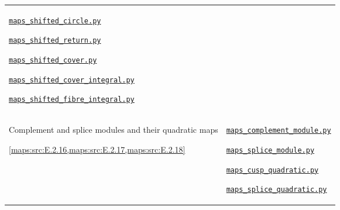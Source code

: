 \documentclass[11pt,a4paper]{article}
\numberwithin{equation}{section}
\theoremstyle{definition}
\newcommand{\SsixRepositoryCommit}{83d76022bcd442278b760db9ff438afceed6c6ea}
\begin{document}
\begin{longtable}{@{}p{}p{}@{}}
\href{https://github.com/KokunoYumeto/s6-complex-structure-workbench/blob/\SsixRepositoryCommit/pro_returns/S6_10_PAPERS_checkpoint_15_20261119T1045Z/S6_10_PAPERS/code/V/replay_chains/code/maps_shifted_circle.py}{\nolinkurl{maps_shifted_circle.py}}\par \href{https://github.com/KokunoYumeto/s6-complex-structure-workbench/blob/\SsixRepositoryCommit/pro_returns/S6_10_PAPERS_checkpoint_15_20261119T1045Z/S6_10_PAPERS/code/V/replay_chains/code/maps_shifted_return.py}{\nolinkurl{maps_shifted_return.py}}\par \href{https://github.com/KokunoYumeto/s6-complex-structure-workbench/blob/\SsixRepositoryCommit/pro_returns/S6_10_PAPERS_checkpoint_15_20261119T1045Z/S6_10_PAPERS/code/V/replay_chains/code/maps_shifted_cover.py}{\nolinkurl{maps_shifted_cover.py}}\par \href{https://github.com/KokunoYumeto/s6-complex-structure-workbench/blob/\SsixRepositoryCommit/pro_returns/S6_10_PAPERS_checkpoint_15_20261119T1045Z/S6_10_PAPERS/code/V/replay_chains/code/maps_shifted_cover_integral.py}{\nolinkurl{maps_shifted_cover_integral.py}}\par \href{https://github.com/KokunoYumeto/s6-complex-structure-workbench/blob/\SsixRepositoryCommit/pro_returns/S6_10_PAPERS_checkpoint_15_20261119T1045Z/S6_10_PAPERS/code/V/replay_chains/code/maps_shifted_fibre_integral.py}{\nolinkurl{maps_shifted_fibre_integral.py}} \\[3pt]
\hypertarget{prog:V:quadratic}{}Complement and splice modules and their quadratic maps\par \cref{maps:src:E.2.16,maps:src:E.2.17,maps:src:E.2.18} &
\href{https://github.com/KokunoYumeto/s6-complex-structure-workbench/blob/\SsixRepositoryCommit/pro_returns/S6_10_PAPERS_checkpoint_15_20261119T1045Z/S6_10_PAPERS/code/V/replay_chains/code/maps_complement_module.py}{\nolinkurl{maps_complement_module.py}}\par \href{https://github.com/KokunoYumeto/s6-complex-structure-workbench/blob/\SsixRepositoryCommit/pro_returns/S6_10_PAPERS_checkpoint_15_20261119T1045Z/S6_10_PAPERS/code/III/maps_splice_module.py}{\nolinkurl{maps_splice_module.py}}\par \href{https://github.com/KokunoYumeto/s6-complex-structure-workbench/blob/\SsixRepositoryCommit/pro_returns/S6_10_PAPERS_checkpoint_15_20261119T1045Z/S6_10_PAPERS/code/III/maps_cusp_quadratic.py}{\nolinkurl{maps_cusp_quadratic.py}}\par \href{https://github.com/KokunoYumeto/s6-complex-structure-workbench/blob/\SsixRepositoryCommit/pro_returns/S6_10_PAPERS_checkpoint_15_20261119T1045Z/S6_10_PAPERS/code/III/maps_splice_quadratic.py}{\nolinkurl{maps_splice_quadratic.py}} \\[3pt]

\end{longtable}
\end{document}
